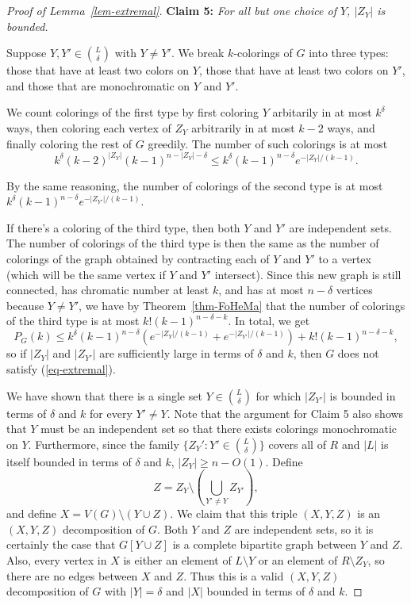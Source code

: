 \documentclass[11pt]{article}
\theoremstyle{plain}
\theoremstyle{definition}
\theoremstyle{remark}
\begin{document}
\begin{proof}[Proof of Lemma~\ref{lem-extremal}]
\bigskip

\noindent \textbf{Claim 5:} {\em For all but one choice of $Y$, $|Z_Y|$ is bounded.}

Suppose $Y,Y'\in{L\choose \delta}$ with $Y \neq Y'$. We break $k$-colorings of $G$ into three types: those that have at least two colors on $Y$, those that have at least two colors on $Y'$, and those that are monochromatic on $Y$ and $Y'$.

We count colorings of the first type by first coloring $Y$ arbitarily in at most $k^\delta$ ways, then coloring each vertex of $Z_Y$ arbitrarily in at most $k-2$ ways, and finally coloring the rest of $G$ greedily. The number of such colorings is at most
\[
k^\delta (k-2)^{|Z_Y|}(k-1)^{n-|Z_Y|-\delta} \le k^\delta (k-1)^{n-\delta} e^{-|Z_Y|/(k-1)}.
\]

By the same reasoning, the number of colorings of the second type is at most $k^\delta (k-1)^{n-\delta} e^{-|Z_{Y'}|/(k-1)}$.

If there's a coloring of the third type, then both $Y$ and $Y'$ are independent sets. The number of colorings of the third type is then the same as the number of colorings of the graph  obtained by contracting each of $Y$ and $Y'$ to a vertex (which will be the same vertex if $Y$ and $Y'$ intersect). Since this new graph is still connected, has chromatic number at least $k$, and has at most $n-\delta$ vertices because $Y \neq Y'$, we have by Theorem~\ref{thm-FoHeMa} that the number of colorings of the third type is at most $k!(k-1)^{n-\delta - k}$. In total, we get
\[
P_G(k) \le k^\delta (k-1)^{n-\delta} (e^{-|Z_Y|/(k-1)} + e^{-|Z_{Y'}|/(k-1)}) + k!(k-1)^{n-\delta - k},
\]
so if $|Z_Y|$ and $|Z_{Y'}|$ are sufficiently large in terms of $\delta$ and $k$, then $G$ does not satisfy (\ref{eq-extremal}). 

\bigskip

We have shown that there is a single set $Y\in {L\choose \delta}$ for which $|Z_{Y'}|$ is bounded in terms of $\delta$ and $k$ for every $Y'\neq Y$. Note that the argument for Claim 5 also shows that $Y$ must be an independent set so that there exists colorings monochromatic on $Y$. Furthermore, since the family $\{Z_Y' : Y' \in {L\choose \delta}\}$ covers all of $R$ and $|L|$ is itself bounded in terms of $\delta$ and $k$, $|Z_Y|\ge n - O(1)$. Define 
\[
Z=Z_Y \setminus (\bigcup_{Y'\ne Y} Z_{Y'}),
\]
and define $X=V(G)\setminus(Y\cup Z)$. We claim that this triple $(X,Y,Z)$ is an $(X,Y,Z)$ decomposition of $G$. Both $Y$ and $Z$ are independent sets, so it is certainly the case that $G[Y\cup Z]$ is a complete bipartite graph between $Y$ and $Z$. Also, every vertex in $X$ is either an element of $L\setminus Y$ or an element of $R\setminus Z_Y$, so there are no edges between $X$ and $Z$. Thus this is a valid $(X,Y,Z)$ decomposition of $G$ with $|Y|=\delta$ and $|X|$ bounded in terms of $\delta$ and $k$.


\end{proof}
\end{document}
